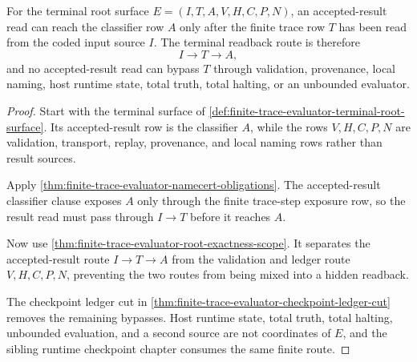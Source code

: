 \begin{theorem}
\label{thm:finite-trace-evaluator-terminal-accepted-result-readback}
For the terminal root surface
$E=(I,T,A,V,H,C,P,N)$, an accepted-result read can reach the classifier row $A$
only after the finite trace row $T$ has been read from the coded input source
$I$. The terminal readback route is therefore
$$
I \to T \to A,
$$
and no accepted-result read can bypass $T$ through validation, provenance,
local naming, host runtime state, total truth, total halting, or an unbounded
evaluator.
\end{theorem}
\begin{proof}
Start with the terminal surface of
\autoref{def:finite-trace-evaluator-terminal-root-surface}. Its accepted-result
row is the classifier $A$, while the rows $V,H,C,P,N$ are validation,
transport, replay, provenance, and local naming rows rather than result
sources.

Apply \autoref{thm:finite-trace-evaluator-namecert-obligations}. The
accepted-result classifier clause exposes $A$ only through the finite
trace-step exposure row, so the result read must pass through $I \to T$ before
it reaches $A$.

Now use \autoref{thm:finite-trace-evaluator-root-exactness-scope}. It separates
the accepted-result route $I \to T \to A$ from the validation and ledger route
$V,H,C,P,N$, preventing the two routes from being mixed into a hidden
readback.

The checkpoint ledger cut in
\autoref{thm:finite-trace-evaluator-checkpoint-ledger-cut} removes the
remaining bypasses. Host runtime state, total truth, total halting, unbounded
evaluation, and a second source are not coordinates of $E$, and the sibling
runtime checkpoint chapter consumes the same finite route.
\end{proof}

